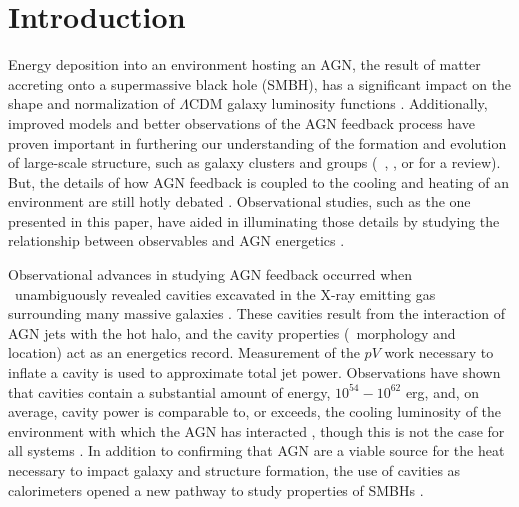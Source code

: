 \documentclass{emulateapj}
\begin{document}


\section{Introduction}
\label{sec:intro}

Energy deposition into an environment hosting an AGN, the result of
matter accreting onto a supermassive black hole (SMBH), has a
significant impact on the shape and normalization of $\Lambda$CDM
galaxy luminosity functions \citep{croton06, bower06, saro06,
  sijacki07}. Additionally, improved models and better observations of
the AGN feedback process have proven important in furthering our
understanding of the formation and evolution of large-scale structure,
such as galaxy clusters and groups
(\eg\ \citealt{2008MNRAS.386.1309M}, \citealt{minggroups}, or
\citealt{2009arXiv0906.4370B} for a review). But, the details of how
AGN feedback is coupled to the cooling and heating of an environment
are still hotly debated \citep{2008ASPC..386..343D}. Observational
studies, such as the one presented in this paper, have aided in
illuminating those details by studying the relationship between
observables and AGN energetics \citep{birzan04, 2005MNRAS.364.1343D,
  rafferty06, dunn08, haradent, birzan08}.

Observational advances in studying AGN feedback occurred when
\chandra\ unambiguously revealed cavities excavated in the X-ray
emitting gas surrounding many massive galaxies
\citep[\eg][]{2000ApJ...534L.135M, perseus1, schindler01}. These
cavities result from the interaction of AGN jets with the hot halo,
and the cavity properties (\ie\ morphology and location) act as an
energetics record. Measurement of the $pV$ work necessary to inflate a
cavity is used to approximate total jet power. Observations have shown
that cavities contain a substantial amount of energy,
$10^{54}-10^{62}$ erg, and, on average, cavity power is comparable to,
or exceeds, the cooling luminosity of the environment with which the
AGN has interacted \citep{birzan04, rafferty06}, though this is not
the case for all systems \citep{dunn08}. In addition to confirming
that AGN are a viable source for the heat necessary to impact galaxy
and structure formation, the use of cavities as calorimeters opened a
new pathway to study properties of SMBHs \citep{2009ApJ...698..594M}.
\end{document}
